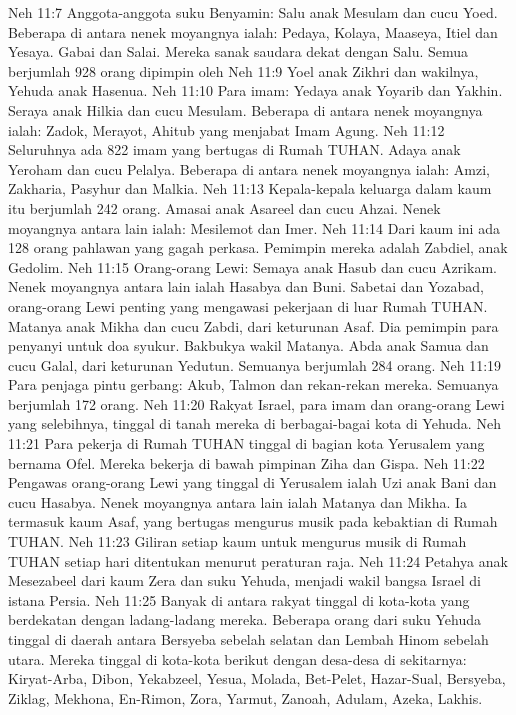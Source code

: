 Neh 11:7  Anggota-anggota suku Benyamin: Salu anak Mesulam dan cucu Yoed. Beberapa di antara nenek moyangnya ialah: Pedaya, Kolaya, Maaseya, Itiel dan Yesaya. Gabai dan Salai. Mereka sanak saudara dekat dengan Salu. Semua berjumlah 928 orang dipimpin oleh
Neh 11:9  Yoel anak Zikhri dan wakilnya, Yehuda anak Hasenua.
Neh 11:10  Para imam: Yedaya anak Yoyarib dan Yakhin. Seraya anak Hilkia dan cucu Mesulam. Beberapa di antara nenek moyangnya ialah: Zadok, Merayot, Ahitub yang menjabat Imam Agung.
Neh 11:12  Seluruhnya ada 822 imam yang bertugas di Rumah TUHAN. Adaya anak Yeroham dan cucu Pelalya. Beberapa di antara nenek moyangnya ialah: Amzi, Zakharia, Pasyhur dan Malkia.
Neh 11:13  Kepala-kepala keluarga dalam kaum itu berjumlah 242 orang. Amasai anak Asareel dan cucu Ahzai. Nenek moyangnya antara lain ialah: Mesilemot dan Imer.
Neh 11:14  Dari kaum ini ada 128 orang pahlawan yang gagah perkasa. Pemimpin mereka adalah Zabdiel, anak Gedolim.
Neh 11:15  Orang-orang Lewi: Semaya anak Hasub dan cucu Azrikam. Nenek moyangnya antara lain ialah Hasabya dan Buni. Sabetai dan Yozabad, orang-orang Lewi penting yang mengawasi pekerjaan di luar Rumah TUHAN. Matanya anak Mikha dan cucu Zabdi, dari keturunan Asaf. Dia pemimpin para penyanyi untuk doa syukur. Bakbukya wakil Matanya. Abda anak Samua dan cucu Galal, dari keturunan Yedutun. Semuanya berjumlah 284 orang.
Neh 11:19  Para penjaga pintu gerbang: Akub, Talmon dan rekan-rekan mereka. Semuanya berjumlah 172 orang.
Neh 11:20  Rakyat Israel, para imam dan orang-orang Lewi yang selebihnya, tinggal di tanah mereka di berbagai-bagai kota di Yehuda.
Neh 11:21  Para pekerja di Rumah TUHAN tinggal di bagian kota Yerusalem yang bernama Ofel. Mereka bekerja di bawah pimpinan Ziha dan Gispa.
Neh 11:22  Pengawas orang-orang Lewi yang tinggal di Yerusalem ialah Uzi anak Bani dan cucu Hasabya. Nenek moyangnya antara lain ialah Matanya dan Mikha. Ia termasuk kaum Asaf, yang bertugas mengurus musik pada kebaktian di Rumah TUHAN.
Neh 11:23  Giliran setiap kaum untuk mengurus musik di Rumah TUHAN setiap hari ditentukan menurut peraturan raja.
Neh 11:24  Petahya anak Mesezabeel dari kaum Zera dan suku Yehuda, menjadi wakil bangsa Israel di istana Persia.
Neh 11:25  Banyak di antara rakyat tinggal di kota-kota yang berdekatan dengan ladang-ladang mereka. Beberapa orang dari suku Yehuda tinggal di daerah antara Bersyeba sebelah selatan dan Lembah Hinom sebelah utara. Mereka tinggal di kota-kota berikut dengan desa-desa di sekitarnya: Kiryat-Arba, Dibon, Yekabzeel, Yesua, Molada, Bet-Pelet, Hazar-Sual, Bersyeba, Ziklag, Mekhona, En-Rimon, Zora, Yarmut, Zanoah, Adulam, Azeka, Lakhis.
